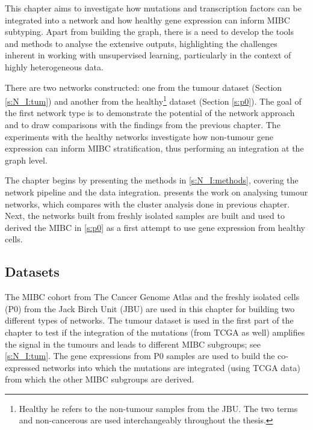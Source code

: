 This chapter aims to investigate how mutations and transcription factors can be integrated into a network and how healthy gene expression can inform MIBC subtyping. Apart from building the graph, there is a need to develop the tools and methods to analyse the extensive outputs, highlighting the challenges inherent in working with unsupervised learning, particularly in the context of highly heterogeneous data.

There are two networks constructed: one from the tumour dataset (Section \ref{s:N_I:tum}) and another from the healthy\footnote{Healthy he refers to the non-tumour samples from the JBU. The two terms and non-cancerous are used interchangeably throughout the thesis.} dataset (Section \ref{s:p0}). The goal of the first network type is to demonstrate the potential of the network approach and to draw comparisons with the findings from the previous chapter. The experiments with the healthy networks investigate how non-tumour gene expression can inform MIBC stratification, thus performing an integration at the graph level.

The chapter begins by presenting the methods in \cref{s:N_I:methods}, covering the network pipeline and the data integration.  presents the work on analysing tumour networks, which compares with the cluster analysis done in previous chapter. Next, the networks built from freshly isolated samples are built and used to derived the MIBC in \cref{s:p0} as a first attempt to use gene expression from healthy cells.




\subsection*{Datasets}

The MIBC cohort from The Cancer Genome Atlas \citep{TCGA2018-rz} and the freshly isolated cells (P0) from the Jack Birch Unit (JBU) are used in this chapter for building two different types of networks. The tumour dataset is used in the first part of the chapter to test if the integration of the mutations (from TCGA as well) amplifies the signal in the tumours and leads to different MIBC subgroups; see \cref{s:N_I:tum}. The gene expressions from P0 samples are used to build the co-expressed networks into which the mutations are integrated (using TCGA data) from which the other MIBC subgroups are derived.

